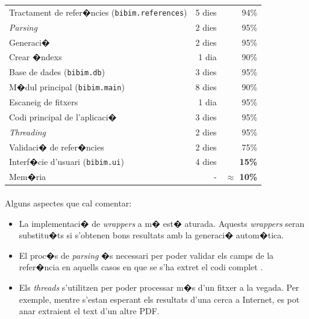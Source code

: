 \documentclass[a4paper,oneside]{article}
\newcommand{\tab}{\hspace*{2em}}
\begin{document}
\begin{center}
\begin{tabular}{|l|r|r|}
Tractament de refer�ncies (\texttt{bibim.references})                       &5 dies     & 94\%\\
\tab \textit{Parsing}                                                       &2 dies     & 95\%\\
\tab Generaci�                                                              &2 dies     & 95\%\\
\tab Crear �ndexs                                                           &1 dia      & 90\%\\
\hline


Base de dades (\texttt{bibim.db})                                           &3 dies     & 95\%\\
\hline


M�dul principal (\texttt{bibim.main})                                       &8 dies     & 90\%\\
\tab Escaneig de fitxers                                                    &1 dia      & 95\%\\
\tab Codi principal de l'aplicaci�                                          &3 dies     & 95\%\\
\tab \textit{Threading}                                                     &2 dies     & 95\%\\
\tab Validaci� de refer�ncies                                               &2 dies     & 75\%\\
\hline


Interf�cie d'usuari (\texttt{bibim.ui})                                     &4 dies     & \textbf{15\%}\\
\hline

Mem�ria                                                                     & -         &\textbf{$\approx$ 10\%}\\
\hline


\hline
\end{tabular}
\end{center}

\paragraph{}
Alguns aspectes que cal comentar:
\begin{itemize}
\item{}La implementaci� de \textit{wrappers} a m� est� aturada. Aquests \textit{wrappers} seran substitu�ts si s'obtenen bons resultats amb la generaci� autom�tica.

\item{}
El proc�s de \textit{parsing} �s necessari per poder validar els camps de la refer�ncia en aquells casos en que se s'ha extret el codi complet \BibTeX.

\item{}
Els \textit{threads} s'utilitzen per poder processar m�s d'un fitxer a la vegada. Per exemple, mentre s'estan esperant els resultats d'una cerca a Internet, es pot anar extraient el text d'un altre PDF.
\end{itemize}
\end{document}
